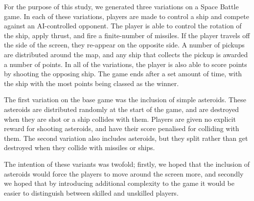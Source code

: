 For the purpose of this study, we generated three variations on a Space Battle game. In each of these variations, players are made to control a ship and compete against an AI-controlled opponent. The player is able to control the rotation of the ship, apply thrust, and fire a finite-number of missiles. If the player travels off the side of the screen, they re-appear on the opposite side. A number of pickups are distributed around the map, and any ship that collects the pickup is awarded a number of points. In all of the variations, the player is also able to score points by shooting the opposing ship. The game ends after a set amount of time, with the ship with the most points being classed as the winner.

The first variation on the base game was the inclusion of simple asteroids. These asteroids are distributed randomly at the start of the game, and are destroyed when they are shot or a ship collides with them. Players are given no explicit reward for shooting asteroids, and have their score penalised for colliding with them. The second variation also includes asteroids, but they split rather than get destroyed when they collide with missiles or ships.

The intention of these variants was twofold; firstly, we hoped that the inclusion of asteroids would force the players to move around the screen more, and secondly we hoped that by introducing additional complexity to the game it would be easier to distinguish between skilled and unskilled players.

